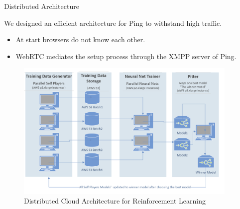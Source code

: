 \documentclass[final]{beamer}
\newlength{\onecolwid}
\newlength{\twocolwid}
\begin{document}
\begin{frame}[t]
\begin{columns}[t]
\begin{column}{\twocolwid}
\begin{columns}[t,totalwidth=\twocolwid]
\begin{column}{\onecolwid}
\begin{block}{Distributed Architecture}

We designed an efficient architecture for Ping to withstand high traffic.

\begin{itemize}
\item At start browsers do not know each other.
\item WebRTC mediates the setup process through the XMPP server of Ping.
\end{itemize}

\begin{figure}
\includegraphics[width=1.0\linewidth]{distributed_arch.png}
\caption{Distributed Cloud Architecture for Reinforcement Learning}
\end{figure}


\end{block}


\end{column} %

\begin{column}{\onecolwid}\vspace{-.6in} %



\end{column}
\end{columns}
\end{column}
\end{columns}
\end{frame}
\end{document}
